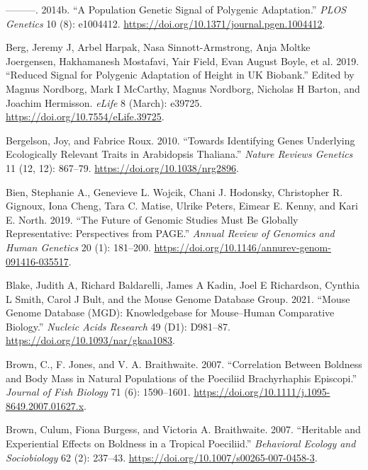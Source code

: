 \documentclass[
]{book}
\newlength{\cslhangindent}
\newlength{\cslentryspacingunit} %
\newenvironment{CSLReferences}[2] %
 {%
  \setlength{\parindent}{0pt}
  \ifodd #1
  \let\oldpar\par
  \def\par{\hangindent=\cslhangindent\oldpar}
  \fi
  \setlength{\parskip}{#2\cslentryspacingunit}
 }%
 {}
\begin{document}
\begin{CSLReferences}{1}{0}
\leavevmode{}%
---------. 2014b. {``A {Population Genetic Signal} of {Polygenic Adaptation}.''} \emph{PLOS Genetics} 10 (8): e1004412. \url{https://doi.org/10.1371/journal.pgen.1004412}.

\leavevmode{}%
Berg, Jeremy J, Arbel Harpak, Nasa Sinnott-Armstrong, Anja Moltke Joergensen, Hakhamanesh Mostafavi, Yair Field, Evan August Boyle, et al. 2019. {``Reduced Signal for Polygenic Adaptation of Height in {UK Biobank}.''} Edited by Magnus Nordborg, Mark I McCarthy, Magnus Nordborg, Nicholas H Barton, and Joachim Hermisson. \emph{eLife} 8 (March): e39725. \url{https://doi.org/10.7554/eLife.39725}.

\leavevmode{}%
Bergelson, Joy, and Fabrice Roux. 2010. {``Towards Identifying Genes Underlying Ecologically Relevant Traits in {Arabidopsis} Thaliana.''} \emph{Nature Reviews Genetics} 11 (12, 12): 867--79. \url{https://doi.org/10.1038/nrg2896}.

\leavevmode{}%
Bien, Stephanie A., Genevieve L. Wojcik, Chani J. Hodonsky, Christopher R. Gignoux, Iona Cheng, Tara C. Matise, Ulrike Peters, Eimear E. Kenny, and Kari E. North. 2019. {``The {Future} of {Genomic Studies Must Be Globally Representative}: {Perspectives} from {PAGE}.''} \emph{Annual Review of Genomics and Human Genetics} 20 (1): 181--200. \url{https://doi.org/10.1146/annurev-genom-091416-035517}.

\leavevmode{}%
Blake, Judith A, Richard Baldarelli, James A Kadin, Joel E Richardson, Cynthia L Smith, Carol J Bult, and the Mouse Genome Database Group. 2021. {``Mouse {Genome Database} ({MGD}): {Knowledgebase} for Mouse--Human Comparative Biology.''} \emph{Nucleic Acids Research} 49 (D1): D981--87. \url{https://doi.org/10.1093/nar/gkaa1083}.

\leavevmode{}%
Brown, C., F. Jones, and V. A. Braithwaite. 2007. {``Correlation Between Boldness and Body Mass in Natural Populations of the Poeciliid {Brachyrhaphis} Episcopi.''} \emph{Journal of Fish Biology} 71 (6): 1590--1601. \url{https://doi.org/10.1111/j.1095-8649.2007.01627.x}.

\leavevmode{}%
Brown, Culum, Fiona Burgess, and Victoria A. Braithwaite. 2007. {``Heritable and Experiential Effects on Boldness in a Tropical Poeciliid.''} \emph{Behavioral Ecology and Sociobiology} 62 (2): 237--43. \url{https://doi.org/10.1007/s00265-007-0458-3}.


\end{CSLReferences}
\end{document}
